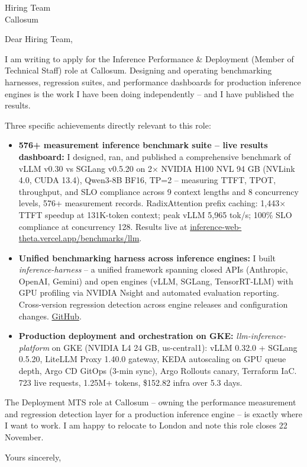 \documentclass[a4paper]{letter}
\date{\today}
\begin{document}
\begin{letter}{Hiring Team \\ Callosum}

\opening{Dear Hiring Team,}

I am writing to apply for the Inference Performance \& Deployment (Member of Technical Staff) role at Callosum. Designing and operating benchmarking harnesses, regression suites, and performance dashboards for production inference engines is the work I have been doing independently -- and I have published the results.

Three specific achievements directly relevant to this role:

\begin{itemize}
  \item \textbf{576+ measurement inference benchmark suite -- live results dashboard:} I designed, ran, and published a comprehensive benchmark of vLLM v0.30 vs SGLang v0.5.20 on 2$\times$ NVIDIA H100 NVL 94 GB (NVLink 4.0, CUDA 13.4), Qwen3-8B BF16, TP=2 -- measuring TTFT, TPOT, throughput, and SLO compliance across 9 context lengths and 8 concurrency levels, 576+ measurement records. RadixAttention prefix caching: 1,443$\times$ TTFT speedup at 131K-token context; peak vLLM 5,965 tok/s; 100\% SLO compliance at concurrency 128. Results live at \href{https://inference-web-theta.vercel.app/benchmarks/llm}{inference-web-theta.vercel.app/benchmarks/llm}.

  \item \textbf{Unified benchmarking harness across inference engines:} I built \textit{inference-harness} -- a unified framework spanning closed APIs (Anthropic, OpenAI, Gemini) and open engines (vLLM, SGLang, TensorRT-LLM) with GPU profiling via NVIDIA Nsight and automated evaluation reporting. Cross-version regression detection across engine releases and configuration changes. \href{https://github.com/AyeniOluwatosinOlawale/inference-harness}{GitHub}.

  \item \textbf{Production deployment and orchestration on GKE:} \textit{llm-inference-platform} on GKE (NVIDIA L4 24 GB, us-central1): vLLM 0.32.0 + SGLang 0.5.20, LiteLLM Proxy 1.40.0 gateway, KEDA autoscaling on GPU queue depth, Argo CD GitOps (3-min sync), Argo Rollouts canary, Terraform IaC. 723 live requests, 1.25M+ tokens, \$152.82 infra over 5.3 days.
\end{itemize}

The Deployment MTS role at Callosum -- owning the performance measurement and regression detection layer for a production inference engine -- is exactly where I want to work. I am happy to relocate to London and note this role closes 22 November.

\closing{Yours sincerely,}

\end{letter}
\end{document}

